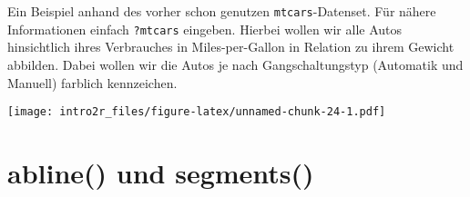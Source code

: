 \documentclass[
]{book}
\newenvironment{Shaded}{\begin{snugshade}}{\end{snugshade}}
\newcommand{\CommentTok}[1]{\textcolor[rgb]{0.56,0.35,0.01}{\textit{#1}}}
\newcommand{\DataTypeTok}[1]{\textcolor[rgb]{0.13,0.29,0.53}{#1}}
\newcommand{\DecValTok}[1]{\textcolor[rgb]{0.00,0.00,0.81}{#1}}
\newcommand{\FloatTok}[1]{\textcolor[rgb]{0.00,0.00,0.81}{#1}}
\newcommand{\KeywordTok}[1]{\textcolor[rgb]{0.13,0.29,0.53}{\textbf{#1}}}
\newcommand{\NormalTok}[1]{#1}
\newcommand{\OperatorTok}[1]{\textcolor[rgb]{0.81,0.36,0.00}{\textbf{#1}}}
\newcommand{\StringTok}[1]{\textcolor[rgb]{0.31,0.60,0.02}{#1}}
\begin{document}
Ein Beispiel anhand des vorher schon genutzen \texttt{mtcars}-Datenset.
Für nähere Informationen einfach \texttt{?mtcars} eingeben.
Hierbei wollen wir alle Autos hinsichtlich ihres Verbrauches in Miles-per-Gallon in Relation zu ihrem Gewicht abbilden.
Dabei wollen wir die Autos je nach Gangschaltungstyp (Automatik und Manuell) farblich kennzeichen.

\begin{Shaded}
\end{Shaded}

\texttt{[image: intro2r\_files/figure-latex/unnamed-chunk-24-1.pdf]}

\hypertarget{abline-und-segments}{%
\section{abline() und segments()}\label{abline-und-segments}}
\end{document}
